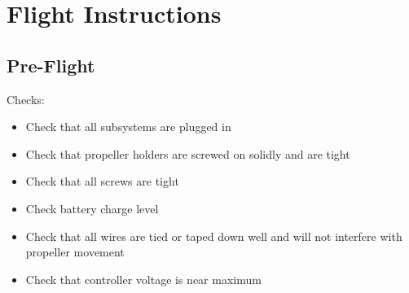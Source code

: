 \section{Flight Instructions}
\subsection{Pre-Flight}
Checks:
\begin{itemize}
\item Check that all subsystems are plugged in
\item Check that propeller holders are screwed on solidly and are tight
\item Check that all screws are tight
\item Check battery charge level
\item Check that all wires are tied or taped down well and will not interfere with propeller movement
\item Check that controller voltage is near maximum
\end{itemize}
